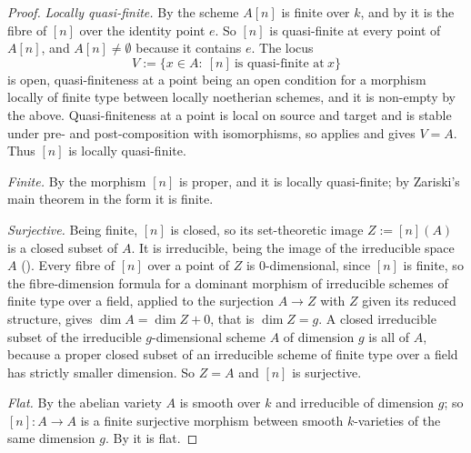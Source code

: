 \begin{proof}
\emph{Locally quasi-finite.}  By  the scheme
$A[n]$ is finite over $k$, and by  it is the
fibre of $[n]$ over the identity point $e$.  So $[n]$ is quasi-finite at every
point of $A[n]$, and $A[n]\neq\emptyset$ because it contains $e$.  The locus
\[
  V:=\{x\in A:\ [n]\ \text{is quasi-finite at}\ x\}
\]
is open, quasi-finiteness at a point being an open condition for a morphism
locally of finite type between locally noetherian schemes, and it is non-empty
by the above.  Quasi-finiteness at a point is local on source and target and is
stable under pre- and post-composition with isomorphisms, so
 applies and gives $V=A$.  Thus $[n]$ is
locally quasi-finite.

\emph{Finite.}  By  the morphism $[n]$ is proper,
and it is locally quasi-finite; by Zariski's main theorem in the form
 it is finite.

\emph{Surjective.}  Being finite, $[n]$ is closed, so its set-theoretic image
$Z:=[n](A)$ is a closed subset of $A$.  It is irreducible, being the image of
the irreducible space $A$ ().  Every fibre of $[n]$ over a
point of $Z$ is $0$-dimensional, since $[n]$ is finite, so the fibre-dimension
formula for a dominant morphism of irreducible schemes of finite type over a
field, applied to the surjection $A\to Z$ with $Z$ given its reduced structure,
gives $\dim A=\dim Z+0$, that is $\dim Z=g$.  A closed irreducible subset of
the irreducible $g$-dimensional scheme $A$ of dimension $g$ is all of $A$,
because a proper closed subset of an irreducible scheme of finite type over a
field has strictly smaller dimension.  So $Z=A$ and $[n]$ is surjective.

\emph{Flat.}  By  the abelian variety $A$ is smooth over
$k$ and irreducible of dimension $g$; so $[n]\colon A\to A$ is a finite
surjective morphism between smooth $k$-varieties of the same dimension $g$.  By
 it is flat.
\end{proof}

